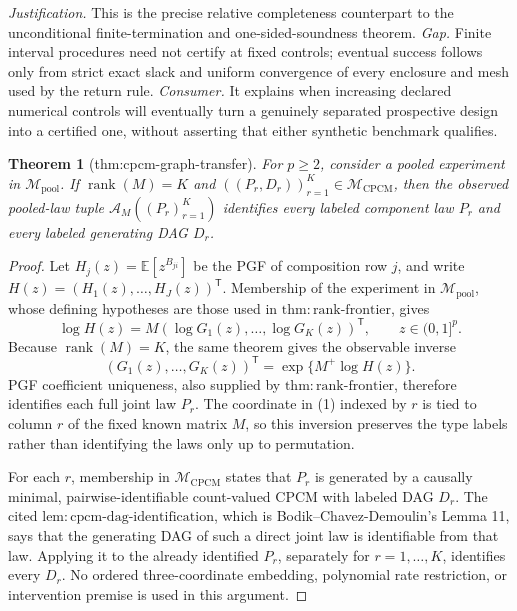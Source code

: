 \documentclass{article}
\newtheorem{theorem}{Theorem}
\begin{document}
\par\smallskip\noindent \textit{Justification.} This is the precise relative completeness counterpart to the unconditional finite-termination and one-sided-soundness theorem. \textit{Gap.} Finite interval procedures need not certify at fixed controls; eventual success follows only from strict exact slack and uniform convergence of every enclosure and mesh used by the return rule. \textit{Consumer.} It explains when increasing declared numerical controls will eventually turn a genuinely separated prospective design into a certified one, without asserting that either synthetic benchmark qualifies.

\begin{theorem}[thm:cpcm-graph-transfer]\label{thm:cpcm-graph-transfer}
For \(p\geq 2\), consider a pooled experiment in \(\mathcal M_{\mathrm{pool}}\). If \(\operatorname{rank}(M)=K\) and \(((P_r,D_r))_{r=1}^{K}\in\mathcal M_{\mathrm{CPCM}}\), then the observed pooled-law tuple \(\mathscr A_M((P_r)_{r=1}^{K})\) identifies every labeled component law \(P_r\) and every labeled generating DAG \(D_r\).
\end{theorem}
\begin{proof}
Let \(H_j(z)=\mathbb E[z^{B_{ji}}]\) be the PGF of composition row \(j\), and write \(H(z)=(H_1(z),\ldots,H_J(z))^{\mathsf T}\). Membership of the experiment in \(\mathcal M_{\mathrm{pool}}\), whose defining hypotheses are those used in \(\mathrm{thm{:}rank\text{-}frontier}\), gives
\[
 \log H(z)=M(\log G_1(z),\ldots,\log G_K(z))^{\mathsf T},
 \qquad z\in(0,1]^p.
\]
Because \(\operatorname{rank}(M)=K\), the same theorem gives the observable inverse
\[
 (G_1(z),\ldots,G_K(z))^{\mathsf T}
 =\exp\{M^+\log H(z)\}. \tag{1}
\]
PGF coefficient uniqueness, also supplied by \(\mathrm{thm{:}rank\text{-}frontier}\), therefore identifies each full joint law \(P_r\). The coordinate in (1) indexed by \(r\) is tied to column \(r\) of the fixed known matrix \(M\), so this inversion preserves the type labels rather than identifying the laws only up to permutation.

For each \(r\), membership in \(\mathcal M_{\mathrm{CPCM}}\) states that \(P_r\) is generated by a causally minimal, pairwise-identifiable count-valued CPCM with labeled DAG \(D_r\). The cited \(\mathrm{lem{:}cpcm\text{-}dag\text{-}identification}\), which is Bodik--Chavez-Demoulin's Lemma 11, says that the generating DAG of such a direct joint law is identifiable from that law. Applying it to the already identified \(P_r\), separately for \(r=1,\ldots,K\), identifies every \(D_r\). No ordered three-coordinate embedding, polynomial rate restriction, or intervention premise is used in this argument.
\end{proof}
\end{document}
